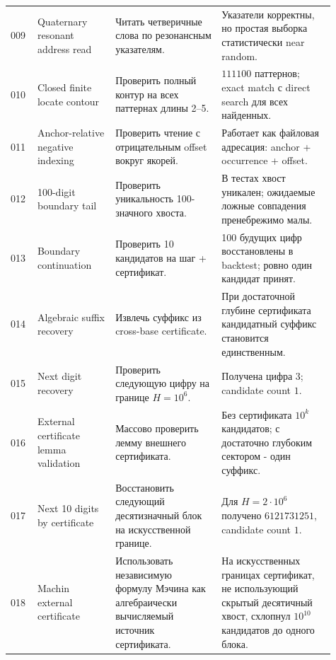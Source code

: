 \documentclass[11pt,a4paper]{article}
\begin{document}
\begin{longtable}{p{0.07\linewidth}p{0.22\linewidth}p{0.30\linewidth}p{0.32\linewidth}}
009 & Quaternary resonant address read & Читать четверичные слова по резонансным указателям. & Указатели корректны, но простая выборка статистически near random. \\
010 & Closed finite locate contour & Проверить полный контур на всех паттернах длины 2--5. & $111100$ паттернов; exact match с direct search для всех найденных. \\
011 & Anchor-relative negative indexing & Проверить чтение с отрицательным offset вокруг якорей. & Работает как файловая адресация: anchor + occurrence + offset. \\
012 & 100-digit boundary tail & Проверить уникальность 100-значного хвоста. & В тестах хвост уникален; ожидаемые ложные совпадения пренебрежимо малы. \\
013 & Boundary continuation & Проверить 10 кандидатов на шаг + сертификат. & 100 будущих цифр восстановлены в backtest; ровно один кандидат принят. \\
014 & Algebraic suffix recovery & Извлечь суффикс из cross-base certificate. & При достаточной глубине сертификата кандидатный суффикс становится единственным. \\
015 & Next digit recovery & Проверить следующую цифру на границе $H=10^6$. & Получена цифра $3$; candidate count $1$. \\
016 & External certificate lemma validation & Массово проверить лемму внешнего сертификата. & Без сертификата $10^k$ кандидатов; с достаточно глубоким сектором - один суффикс. \\
017 & Next 10 digits by certificate & Восстановить следующий десятизначный блок на искусственной границе. & Для $H=2\cdot10^6$ получено $6121731251$, candidate count $1$. \\
018 & Machin external certificate & Использовать независимую формулу Мэчина как алгебраически вычисляемый источник сертификата. & На искусственных границах сертификат, не использующий скрытый десятичный хвост, схлопнул $10^{10}$ кандидатов до одного блока. \\
\bottomrule
\end{longtable}
\end{document}
